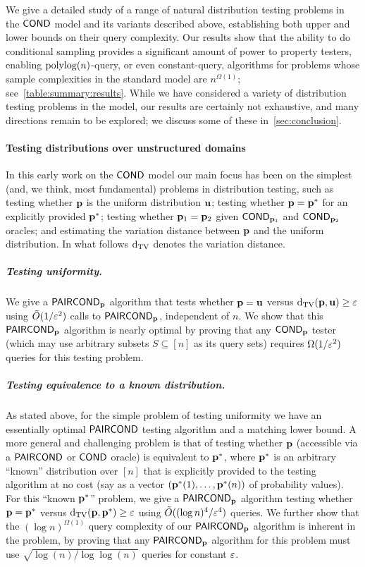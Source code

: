 We give a detailed study of a range of
natural distribution testing problems in the ${\sf COND}$ model and its
variants described above, establishing both upper and lower bounds on
their query complexity.  Our results show that the ability to do
conditional sampling provides a significant amount of power to property
testers, enabling ${\operatorname*{poly}\!\log}(n)$-query, or even constant-query, algorithms
for {problems} whose sample complexities in the standard
model are $n^{\Omega(1)}$; see~\cref{table:summary:results}.
While we have considered a {variety} of distribution testing problems
in the \COND model, our results are certainly not exhaustive, and many
directions remain to be explored; we discuss some of these
in~\cref{sec:conclusion}.

\paragraph{Testing distributions over unstructured domains}
In this early work on the
${\sf COND}$ model our main focus has been on the simplest (and, we think,
most fundamental) problems in distribution testing, such as testing
whether $\mathbf{p}$ is the uniform distribution $\mathbf{u}$; testing whether $\mathbf{p}
= \mathbf{p}^\ast$ for an explicitly provided $\mathbf{p}^\ast$;
testing whether $\mathbf{p}_1 = \mathbf{p}_2$
given ${\sf COND}_{\mathbf{p}_1}$ and ${\sf COND}_{\mathbf{p}_2}$ oracles;
and estimating the variation
distance between $\mathbf{p}$ and the uniform distribution.
In what follows $\operatorname{d}_{\rm{TV}}$ denotes the variation distance.


\subparagraph{Testing uniformity.}  We give a ${\sf PAIRCOND}_{\mathbf{p}}$ algorithm
that tests whether
{$\mathbf{p} = \mathbf{u}$} versus  \mbox{$\operatorname{d}_{\rm{TV}}(\mathbf{p},\mathbf{u})
\geq \varepsilon$} using $\tilde{O}(1/\varepsilon^2)$ calls to ${\sf PAIRCOND}_{\mathbf{p}}$,
independent of $n$.  We show that this ${\sf PAIRCOND}_{\mathbf{p}}$ algorithm
is nearly optimal by proving that any ${\sf COND}_{\mathbf{p}}$ tester (which may use
arbitrary subsets $S \subseteq [n]$ as its query sets) requires
$\Omega(1/\varepsilon^2)$ queries for this testing problem.

\subparagraph{Testing equivalence to a known distribution.}
As stated above, for the simple problem of testing uniformity
we have an essentially optimal ${\sf PAIRCOND}$ testing algorithm
and a matching lower bound. A more general and challenging problem is that
of testing whether
$\mathbf{p}$ (accessible via a ${\sf PAIRCOND}$ or ${\sf COND}$ oracle)
is equivalent to $\mathbf{p}^\ast$, where $\mathbf{p}^\ast$ is an arbitrary
``known'' distribution over $[n]$ that is explicitly
provided to the testing algorithm at no cost (say as a vector
$(\mathbf{p}^\ast(1),\dots,\mathbf{p}^\ast(n))$ of probability values).
For this ``known $\mathbf{p}^\ast$'' problem,
we give a ${\sf PAIRCOND}_{\mathbf{p}}$ algorithm testing whether
{\mbox{$\mathbf{p} = \mathbf{p}^\ast$}}
versus $\operatorname{d}_{\rm{TV}}(\mathbf{p},\mathbf{p}^\ast) \geq \varepsilon$ using
$\tilde{O}((\log n)^4/\varepsilon^4)$ queries.   We
further show that the $(\log n)^{\Omega(1)}$ query complexity
of our ${\sf PAIRCOND}_{\mathbf{p}}$ algorithm is inherent in the problem, by proving
that any ${\sf PAIRCOND}_{\mathbf{p}}$ algorithm for this problem must use
$\sqrt{\log(n)/\log\log(n)}$ queries for constant $\varepsilon$.

